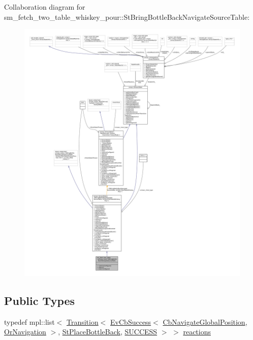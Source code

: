 Collaboration diagram for sm\+\_\+fetch\+\_\+two\+\_\+table\+\_\+whiskey\+\_\+pour\+:\+:St\+Bring\+Bottle\+Back\+Navigate\+Source\+Table\+:
\nopagebreak
\begin{figure}[H]
\begin{center}
\leavevmode
\includegraphics[width=350pt]{structsm__fetch__two__table__whiskey__pour_1_1StBringBottleBackNavigateSourceTable__coll__graph}
\end{center}
\end{figure}
\subsection*{Public Types}
\begin{DoxyCompactItemize}
\item 
typedef mpl\+::list$<$ \hyperlink{classsmacc_1_1Transition}{Transition}$<$ \hyperlink{structsmacc_1_1EvCbSuccess}{Ev\+Cb\+Success}$<$ \hyperlink{classcl__move__base__z_1_1CbNavigateGlobalPosition}{Cb\+Navigate\+Global\+Position}, \hyperlink{classsm__fetch__two__table__whiskey__pour_1_1OrNavigation}{Or\+Navigation} $>$, \hyperlink{structsm__fetch__two__table__whiskey__pour_1_1StPlaceBottleBack}{St\+Place\+Bottle\+Back}, \hyperlink{structsmacc_1_1default__transition__tags_1_1SUCCESS}{S\+U\+C\+C\+E\+SS} $>$ $>$ \hyperlink{structsm__fetch__two__table__whiskey__pour_1_1StBringBottleBackNavigateSourceTable_a5b1307ce44e008392d71e88bc5ba5d39}{reactions}
\end{DoxyCompactItemize}
